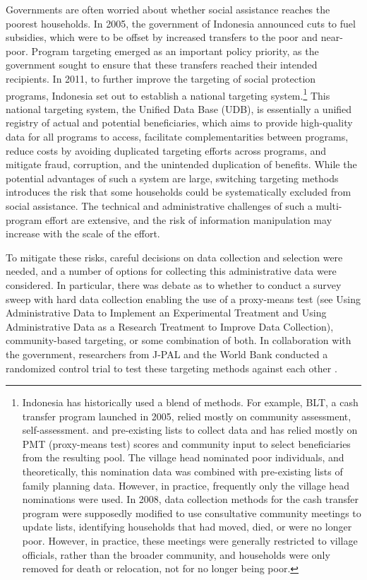 Governments are often worried about whether social assistance reaches the poorest households. In 2005, the government of Indonesia announced cuts to fuel subsidies, which were to be offset by increased transfers to the poor and near-poor. Program targeting emerged as an important policy priority, as the government sought to ensure that these transfers reached their intended recipients. In 2011, to further improve the targeting of social protection programs, Indonesia set out to establish a national targeting system.\footnote{Indonesia has historically used a blend of methods. For example, BLT, a cash transfer program launched in 2005, relied mostly on community assessment, self-assessment. and pre-existing lists to collect data and has relied mostly on PMT (proxy-means test) scores and community input to select beneficiaries from the resulting pool. The village head nominated poor individuals, and theoretically, this nomination data was combined with pre-existing lists of family planning data. However, in practice, frequently only the village head nominations were used. In 2008, data collection methods for the cash transfer program were supposedly modified to use consultative community meetings to update lists, identifying households that had moved, died, or were no longer poor. However, in practice, these meetings were generally restricted to village officials, rather than the broader community, and households were only removed for death or relocation, not for no longer being poor.} This national targeting system, the Unified Data Base (UDB), is essentially a unified registry of actual and potential beneficiaries, which aims to provide high-quality data for all programs to access, facilitate complementarities between programs, reduce costs by avoiding duplicated targeting efforts across programs, and mitigate fraud, corruption, and the unintended duplication of benefits. While the potential advantages of such a system are large, switching targeting methods introduces the risk that some households could be systematically excluded from social assistance. The technical and administrative challenges of such a multi-program effort are extensive, and the risk of information manipulation may increase with the scale of the effort.

To mitigate these risks, careful decisions on data collection and selection were needed, and a number of options for collecting this administrative data were considered. In particular, there was debate as to whether to conduct a survey sweep with hard data collection enabling the use of a proxy-means test (see Using Administrative Data to Implement an Experimental Treatment and Using Administrative Data as a Research Treatment to Improve Data Collection), community-based targeting, or some combination of both. In collaboration with the government, researchers from J-PAL and the World Bank conducted a randomized control trial to test these targeting methods against each other \citep{alatas2012}.

